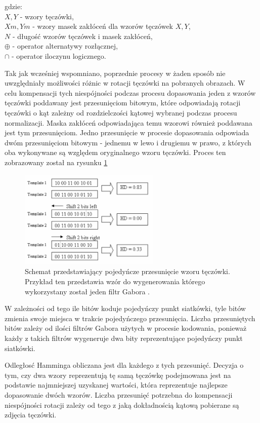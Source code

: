 \noindent
gdzie:\\
\indent $X, Y$ - wzory tęczówki,\\
\indent $\mathit{Xm}, \mathit{Ym}$ - wzory masek zakłóceń dla wzorów tęczówek $X, Y$,\\
\indent $N$ - długoś\'c wzorów tęczówek i masek zakłóceń,\\
\indent $\oplus$ - operator alternatywy rozłącznej,\\
\indent $\cap$ - operator iloczynu logicznego.\newline

Tak jak wcześniej wspomniano, poprzednie procesy w żaden sposób nie uwzględniały możliwości różnic
w rotacji tęczówki na pobranych obrazach. W celu kompensacji tych niespójności podczas procesu
dopasowania jeden z wzorów tęczówki poddawany jest przesunięciom bitowym, które odpowiadają rotacji
tęczówki o kąt zależny od rozdzielczości kątowej wybranej podczas procesu normalizacji. Maska zakłóceń
odpowiadająca temu wzorowi również poddawana jest tym przesunięciom.
Jedno przesunięcie w procesie dopasowania odpowiada dwóm przesunięciom bitowym - jednemu w lewo i
drugiemu w prawo, z których oba wykonywane są względem oryginalnego wzoru tęczówki. Proces ten
zobrazowany został na rysunku \ref{fig:matchingShifting}

\begin{figure}
  \centering
  \includegraphics[width=0.6\textwidth]{images/matching/shifting.png}
  \caption{Schemat przedstawiający pojedyńcze przesunięcie wzoru tęczówki. Przykład ten przedstawia
  wzór do wygenerowania którego wykorzystany został jeden filtr Gabora \cite{masek}.}
  \label{fig:matchingShifting}
\end{figure}

W zależności od tego ile bitów koduje pojedyńczy punkt siatkówki, tyle bitów zmienia swoje miejsca
w trakcie pojedyńczego przesunięcia. Liczba przesuniętych bitów zależy od ilości filtrów Gabora
użytych w procesie kodowania, ponieważ każdy z takich filtrów wygeneruje dwa bity reprezentujące
pojedyńczy punkt siatkówki.

Odległos\'c Hamminga obliczana jest dla każdego z tych przesunię\'c. Decyzja o tym, czy dwa wzory
reprezentują tę samą tęczówkę podejmowana jest na podstawie najmniejszej uzyskanej wartości,
która reprezentuje najlepsze dopasowanie dwóch wzorów. Liczba przesunię\'c potrzebna do kompensacji
niespójności rotacji zależy od tego z jaką dokładnością kątową pobierane są zdjęcia tęczówki.
